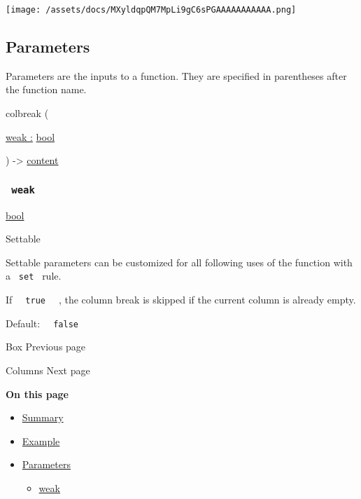 \texttt{[image: /assets/docs/MXyldqpQM7MpLi9gC6sPGAAAAAAAAAAA.png]}

\subsection{\texorpdfstring{{ Parameters
}}{ Parameters }}\label{parameters}

\label{parameters-tooltip}
Parameters are the inputs to a function. They are specified in
parentheses after the function name.

{ colbreak } (

{ \hyperref[parameters-weak]{weak :}
\href{/docs/reference/foundations/bool/}{bool} }

) -\textgreater{} \href{/docs/reference/foundations/content/}{content}

\subsubsection{\texorpdfstring{\texttt{\ weak\ }}{ weak }}\label{parameters-weak}

\href{/docs/reference/foundations/bool/}{bool}

{{ Settable }}

\label{parameters-weak-settable-tooltip}
Settable parameters can be customized for all following uses of the
function with a \texttt{\ set\ } rule.

If \texttt{\ }{\texttt{\ true\ }}\texttt{\ } , the column break is
skipped if the current column is already empty.

Default: \texttt{\ }{\texttt{\ false\ }}\texttt{\ }

\href{/docs/reference/layout/box/}{\pandocbounded{}}

{ Box } { Previous page }

\href{/docs/reference/layout/columns/}{\pandocbounded{}}

{ Columns } { Next page }

\textbf{On this page}

\begin{itemize}
\tightlist
\item
  \hyperref[summary]{Summary}
\item
  \hyperref[example]{Example}
\item
  \hyperref[parameters]{Parameters}

  \begin{itemize}
  \tightlist
  \item
    \hyperref[parameters-weak]{weak}
  \end{itemize}
\end{itemize}

